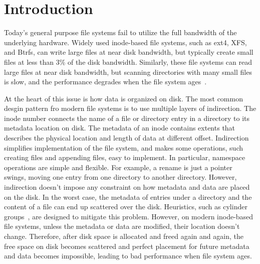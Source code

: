 \chapter{Introduction}
\label{chap:intro}

Today's general purpose file systems fail to utilize the full bandwidth of the
underlying hardware.
Widely used inode-based file systems, such as ext4, XFS, and Btrfs, can write
large files at near disk bandwidth,
but typically create small files at less than 3\% of the disk bandwidth.
Similarly, these file systems can read large files at near disk bandwidth,
but scanning directories with many small files is slow, and the performance
degrades when the file system ages~\citep{betrfs3}.

At the heart of this issue is how data is organized on disk.
The most common desgin pattern fro modern file systems is to use multiple layers
of indirection.
The inode number connects the name of a file or directory entry in a directory
to its metadata location on disk.
The metadata of an inode contains extents that describes the physical location
and length of data at different offset.
Indirection simplifies implementation of the file system, and makes some
operations, such creating files and appending files, easy to implement.
In particular, namespace operations are simple and flexible.
For example, a rename is just a pointer swings, moving one entry from one
directory to another directory.
However, indirection doesn't impose any constraint on how metadata and data
are placed on the disk.
In the worst case, the metadata of entries under a directory and the content of
a file can end up scattered over the disk.
Heuristics, such as cylinder groups~\citep{ffs1}, are designed to mitigate this
problem.
However, on modern inode-based file systems, unless the metadata or data are
modified, their location doesn't change.
Therefore, after disk space is allocated and freed again and again, the free
space on disk becomes scattered and perfect placement for future metadata and
data becomes impossible, leading to bad performance when file system ages.

